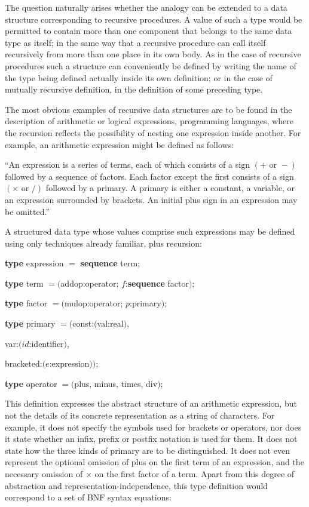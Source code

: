 \documentclass[twoside,11pt]{book}
\begin{document}
The question naturally arises whether the analogy can be extended to a data structure corresponding to recursive procedures. A value of such a type would be permitted to contain more than one component that belongs to the same data type as itself; in the same way that a recursive procedure can call itself recursively from more than one place in its own body. As in the case of recursive procedures such a structure can conveniently be defined by writing the name of the type being defined actually inside its own definition; or in the case of mutually recursive definition, in the definition of some preceding type.

The most obvious examples of recursive data structures are to be found in the description of arithmetic or logical expressions, programming languages, where the recursion reflects the possibility of nesting one expression inside another. For example, an arithmetic expression might be defined as follows:

``An expression is a series of terms, each of which consists of a sign $(+ \text{ or } -)$ followed by a sequence of factors. Each factor except the first consists of a sign $(\times \text{ or } /)$ followed by a primary. A primary is either a constant, a variable, or an expression surrounded by brackets. An initial plus sign in an expression may be omitted.''

A structured data type whose values comprise such expressions may be defined using only techniques already familiar, plus recursion:

\quad \textbf{type} expression $=$ \textbf{sequence} term;

\quad \textbf{type} term $= ($addop:operator; $f$:\textbf{sequence} factor$)$;

\quad \textbf{type} factor $= ($mulop:operator; $p$:primary$)$;

\quad \textbf{type} primary $= ($const:$($val:real$)$,

\tabto*{9.3em}var:$(id$:identifier$)$,

\tabto*{9.3em}bracketed:$(e$:expression$))$;

\quad \textbf{type} operator $= ($plus, minus, times, div$)$;

This definition expresses the abstract structure of an arithmetic expression, but not the details of its concrete representation as a string of characters. For example, it does not specify the symbols used for brackets or operators, nor does it state whether an infix, prefix or postfix notation is used for them. It does not state how the three kinds of primary are to be distinguished. It does not even represent the optional omission of plus on the first term of an expression, and the necessary omission of $\times$ on the first factor of a term. Apart from this degree of abstraction and representation-independence, this type definition would correspond to a set of BNF syntax equations:
\end{document}

